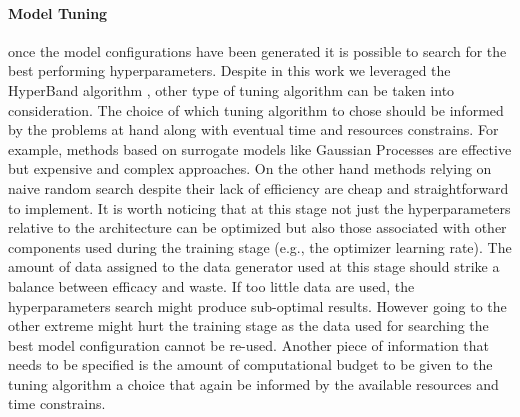 \paragraph*{Model Tuning} once the model configurations have been generated it is possible to search for the best performing hyperparameters. Despite in this work we leveraged the HyperBand algorithm \cite{li2017hyperband}, other type of tuning algorithm can be taken into consideration.  The choice of which tuning algorithm to chose should be informed by the problems at hand along with eventual time and resources constrains. For example, methods based on surrogate models like Gaussian Processes \cite{bergstra2011algorithms} are effective but expensive and complex approaches. On the other hand methods relying on naive random search despite their lack of efficiency are cheap and straightforward to implement. It is worth noticing that at this stage not just the hyperparameters relative to the architecture can be optimized but also those associated with other components used during the training stage (e.g., the optimizer learning rate). The amount of data assigned to the data generator used at this stage should strike a balance between efficacy and waste. If too little data are used, the hyperparameters search might produce sub-optimal results. However going to the other extreme might hurt the training stage as the data used for searching the best model configuration cannot be re-used. Another piece of information that needs to be specified is the amount of computational budget to be given to the tuning algorithm a choice that again be informed by the available resources and time constrains.

